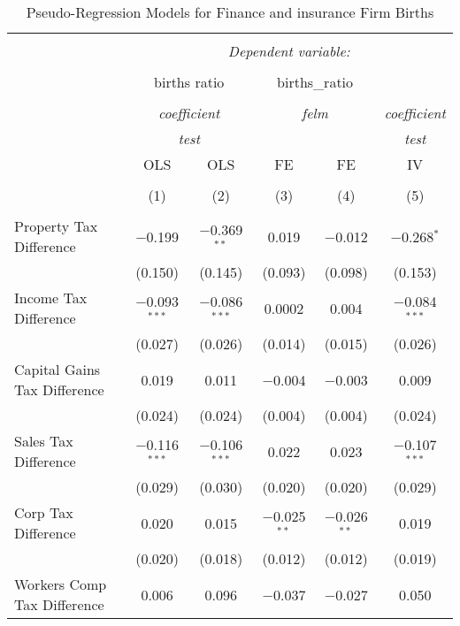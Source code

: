 
\begin{table}[!htbp] \centering 
  \caption{Pseudo-Regression Models for  Finance and insurance Firm Births} 
  \label{} 
\begin{tabular}{@{\extracolsep{5pt}}lccccc} 
\\[-1.8ex]\hline 
\hline \\[-1.8ex] 
 & \multicolumn{5}{c}{\textit{Dependent variable:}} \\ 
\cline{2-6} 
\\[-1.8ex] & \multicolumn{2}{c}{births ratio} & \multicolumn{2}{c}{births\_ratio} &   \\ 
\\[-1.8ex] & \multicolumn{2}{c}{\textit{coefficient}} & \multicolumn{2}{c}{\textit{felm}} & \textit{coefficient} \\ 
 & \multicolumn{2}{c}{\textit{test}} & \multicolumn{2}{c}{\textit{}} & \textit{test} \\ 
 & OLS & OLS & FE & FE & IV \\ 
\\[-1.8ex] & (1) & (2) & (3) & (4) & (5)\\ 
\hline \\[-1.8ex] 
 Property Tax Difference & $-$0.199 & $-$0.369$^{**}$ & 0.019 & $-$0.012 & $-$0.268$^{*}$ \\ 
  & (0.150) & (0.145) & (0.093) & (0.098) & (0.153) \\ 
  Income Tax Difference & $-$0.093$^{***}$ & $-$0.086$^{***}$ & 0.0002 & 0.004 & $-$0.084$^{***}$ \\ 
  & (0.027) & (0.026) & (0.014) & (0.015) & (0.026) \\ 
  Capital Gains Tax Difference & 0.019 & 0.011 & $-$0.004 & $-$0.003 & 0.009 \\ 
  & (0.024) & (0.024) & (0.004) & (0.004) & (0.024) \\ 
  Sales Tax Difference & $-$0.116$^{***}$ & $-$0.106$^{***}$ & 0.022 & 0.023 & $-$0.107$^{***}$ \\ 
  & (0.029) & (0.030) & (0.020) & (0.020) & (0.029) \\ 
  Corp Tax Difference & 0.020 & 0.015 & $-$0.025$^{**}$ & $-$0.026$^{**}$ & 0.019 \\ 
  & (0.020) & (0.018) & (0.012) & (0.012) & (0.019) \\ 
  Workers Comp Tax Difference & 0.006 & 0.096 & $-$0.037 & $-$0.027 & 0.050 \\ 

\end{tabular}
\end{table}
